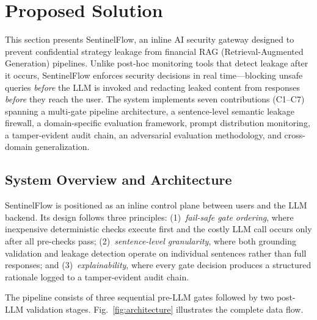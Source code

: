 \documentclass[journal]{IEEEtran}
\begin{document}
\section{Proposed Solution}
\label{Sect:Proposed_Solution}
%
This section presents SentinelFlow, an inline AI security gateway designed to prevent confidential strategy leakage from financial RAG (Retrieval-Augmented Generation) pipelines. Unlike post-hoc monitoring tools that detect leakage after it occurs, SentinelFlow enforces security decisions in real time---blocking unsafe queries \textit{before} the LLM is invoked and redacting leaked content from responses \textit{before} they reach the user. The system implements seven contributions (C1--C7) spanning a multi-gate pipeline architecture, a sentence-level semantic leakage firewall, a domain-specific evaluation framework, prompt distribution monitoring, a tamper-evident audit chain, an adversarial evaluation methodology, and cross-domain generalization.


\subsection{System Overview and Architecture}
\label{Sect:System_Overview}

SentinelFlow is positioned as an inline control plane between users and the LLM backend. Its design follows three principles: (1)~\textit{fail-safe gate ordering}, where inexpensive deterministic checks execute first and the costly LLM call occurs only after all pre-checks pass; (2)~\textit{sentence-level granularity}, where both grounding validation and leakage detection operate on individual sentences rather than full responses; and (3)~\textit{explainability}, where every gate decision produces a structured rationale logged to a tamper-evident audit chain.

The pipeline consists of three sequential pre-LLM gates followed by two post-LLM validation stages. Fig.~\ref{fig:architecture} illustrates the complete data flow.
\end{document}
